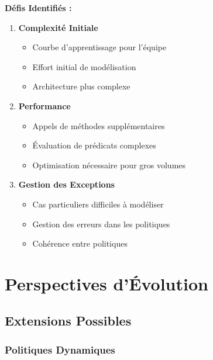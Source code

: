 \documentclass[12pt,a4paper]{article}
\begin{document}
    \begin{warningbox}
        \textbf{Défis Identifiés :}

        \begin{enumerate}
            \item \textbf{Complexité Initiale}
            \begin{itemize}
                \item Courbe d'apprentissage pour l'équipe
                \item Effort initial de modélisation
                \item Architecture plus complexe
            \end{itemize}

            \item \textbf{Performance}
            \begin{itemize}
                \item Appels de méthodes supplémentaires
                \item Évaluation de prédicats complexes
                \item Optimisation nécessaire pour gros volumes
            \end{itemize}

            \item \textbf{Gestion des Exceptions}
            \begin{itemize}
                \item Cas particuliers difficiles à modéliser
                \item Gestion des erreurs dans les politiques
                \item Cohérence entre politiques
            \end{itemize}
        \end{enumerate}
    \end{warningbox}

    \newpage

    \section{Perspectives d'Évolution}

    \subsection{Extensions Possibles}

    \subsubsection{Politiques Dynamiques}
\end{document}
